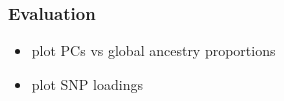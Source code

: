 \documentclass[12pt]{article}
\newcommand{\edit}[1]{{\color{red}{#1}}}
\newcommand{\add}[1]{{\color{red}{[... #1 ...]}}}
\begin{document}
%







\subsubsection{Evaluation}

\begin{itemize}
\item plot PCs vs global ancestry proportions
\item plot SNP loadings 
\end{itemize}
\end{document}
